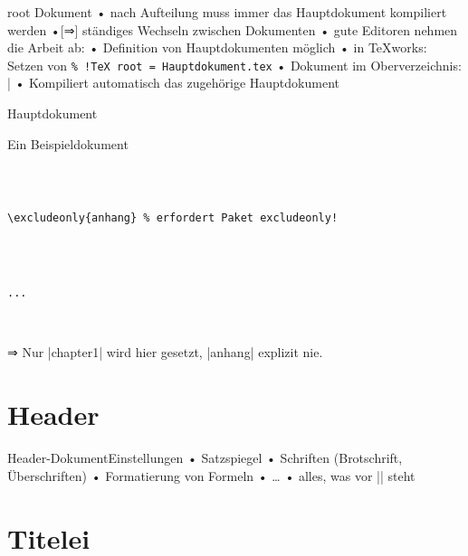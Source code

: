 \begin{frame}[fragile]{root Dokument}
• nach Aufteilung muss immer das Hauptdokument kompiliert werden
•[⇒] ständiges Wechseln zwischen Dokumenten\pause
• gute Editoren nehmen die Arbeit ab:
• Definition von Hauptdokumenten möglich
• in \TeX works: Setzen von \verb*?% !TeX root = Hauptdokument.tex?
• Dokument im Oberverzeichnis: |%
• Kompiliert automatisch das zugehörige Hauptdokument
\•
\end{frame}

\begin{frame}[fragile]{Hauptdokument}
\begin{block}{Ein Beispieldokument}
\begin{verbatim}



\excludeonly{anhang} % erfordert Paket excludeonly!




...



\end{verbatim}
\end{block}
⇒ Nur |chapter1| wird hier gesetzt, |anhang| explizit nie.
\end{frame}

\section{Header}
\begin{frame}[fragile]{Header-Dokument}{Einstellungen}
• Satzspiegel
• Schriften (Brotschrift, Überschriften)
• Formatierung von Formeln
• …
• alles, was vor || steht
\•
\end{frame}

\section{Titelei}

